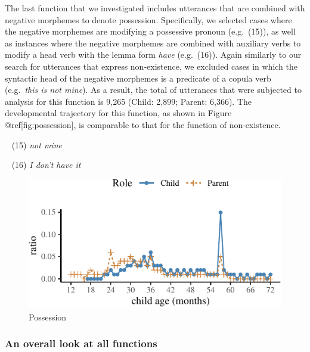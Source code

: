 \documentclass[10pt, letterpaper]{article}
\newenvironment{CodeChunk}{}{}
\begin{document}
The last function that we investigated includes utterances that are
combined with negative morphemes to denote possession. Specifically, we
selected cases where the negative morphemes are modifying a possessive
pronoun (e.g.~(15)), as well as instances where the negative morphemes
are combined with auxiliary verbs to modify a head verb with the lemma
form \emph{have} (e.g.~(16)). Again similarly to our search for
utterances that express non-existence, we excluded cases in which the
syntactic head of the negative morphemes is a predicate of a copula verb
(e.g.~\emph{this is not mine}). As a result, the total of utterances
that were subjected to analysis for this function is 9,265 (Child:
2,899; Parent: 6,366). The developmental trajectory for this function,
as shown in Figure @ref{[}fig:possession{]}, is comparable to that for
the function of non-existence.

~ (15) \emph{not mine}

~ (16) \emph{I don't have it}

\begin{CodeChunk}
\begin{figure}[H]

{\centering \includegraphics{figs/possession-1} 

}

\caption[Possession]{Possession}\label{fig:possession}
\end{figure}
\end{CodeChunk}

\hypertarget{an-overall-look-at-all-functions}{%
\subsubsection{An overall look at all
functions}\label{an-overall-look-at-all-functions}}
\end{document}
